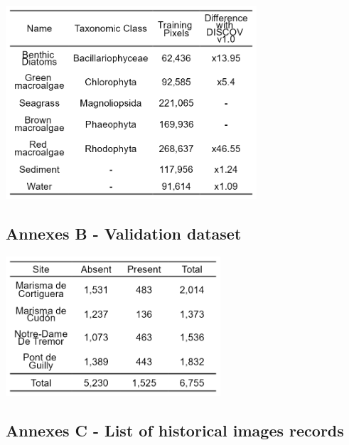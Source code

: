 \documentclass[
  letterpaper,
  11pt,
  english,
  singlespacing,
  headsepline]{MastersDoctoralThesis}
\begin{document}
\begin{spacing}{1.5}
\begin{table}[htbp]
  \centering
  \includegraphics[width=0.7\textwidth]{Chapter4/Figs/AnnexeA.png}
  \caption{Annexe 4.1 - Class of the Neural Network model, with the number of training pixels used to train that class and the differences with the training dataset of DISCOV v1.0.}
  \label{tbl-update_training}
\end{table}

\newpage

\subsection{Annexes B - Validation dataset}\label{sec-AnnexeB}

\begin{table}[htbp]
  \centering
  \includegraphics[width=0.6\textwidth]{Chapter4/Figs/AnnexeB.png}
  \caption{Annexe 4.2 - Presence and absence of red macroalgae for each drone flight}
  \label{tbl-ValidationDataset}
\end{table}

\newpage

\subsection{Annexes C - List of historical images
records}\label{sec-AnnexeC}


\end{spacing}
\end{document}
